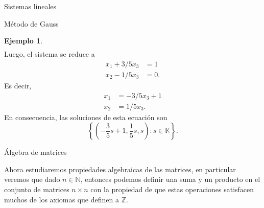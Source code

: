 \documentclass[a4paper,12pt,twoside,spanish,reqno]{amsbook}
\theoremstyle{definition}
\newtheorem{ejemplo}{Ejemplo}[section]
\theoremstyle{remark}
\newcommand{\K}{\mathbb K}
\begin{document}
\begin{chapter}{Sistemas lineales}
\begin{section}{Método de Gauss }
\begin{ejemplo}
\begin{multline*}
                    \end{multline*}	
                    Luego,  el sistema se reduce  a
                    \begin{align*}
                    x_1  + 3/5x_3  &= 1\\
                    x_2 -1/5 x_3  &= 0.
                    \end{align*}
                    Es decir, 
                    \begin{align*}
                    x_1    &= - 3/5x_3 + 1\\
                    x_2   &= 1/5 x_3.
                    \end{align*}
                    En consecuencia,  las soluciones de esta ecuación son
                    \begin{equation*}
                    \left\{(-\frac{3}5s + 1, \frac15 s, s ): s \in \K \right\}.
                    \end{equation*}
                \end{ejemplo} 
                
            
            
            
        \end{section}
        
        
        
        
        
        
        
        
        \begin{section}{Álgebra de matrices}\label{seccion-alg-de-matrices}
            
            Ahora estudiaremos propiedades algebraicas de las matrices,  en particular veremos que dado $n\in \mathbb N$, entonces podemos definir una suma y un producto en el conjunto de matrices $n \times n$ con la propiedad de que estas operaciones satisfacen muchos de los axiomas que definen a  $\mathbb Z$.  
            
            
\end{section}
\end{chapter}
\end{document}
